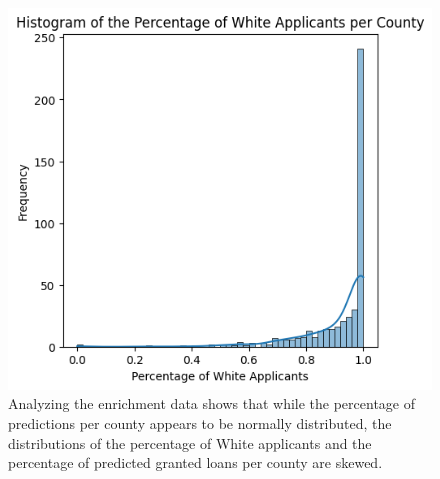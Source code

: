 \begin{figure}[h]
\begin{minipage}{0.33\textwidth}
    \end{minipage}\hfill
    \begin{minipage}{0.33\textwidth}
        \centering
        \includegraphics[width=\textwidth]{images/geo_enrich/white_per_county.png}
    \end{minipage}\hfill
    \label{fig:Enrichment_Data_EDA}
    \caption*{Analyzing the enrichment data shows that while the percentage of predictions per county appears to be normally distributed, the distributions of the percentage of White applicants and the percentage of predicted granted loans per county are skewed.}
\end{figure}

